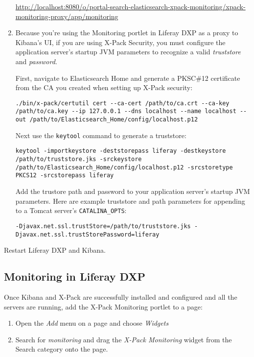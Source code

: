 \begin{enumerate}
  \url{http://localhost:8080/o/portal-search-elasticsearch-xpack-monitoring/xpack-monitoring-proxy/app/monitoring}
\item
  Because you're using the Monitoring portlet in Liferay DXP as a proxy
  to Kibana's UI, if you are using X-Pack Security, you must configure
  the application server's startup JVM parameters to recognize a valid
  \emph{truststore} and \emph{password}.

  First, navigate to Elasticsearch Home and generate a PKSC\#12
  certificate from the CA you created when setting up X-Pack security:

\begin{verbatim}
./bin/x-pack/certutil cert --ca-cert /path/to/ca.crt --ca-key /path/to/ca.key --ip 127.0.0.1 --dns localhost --name localhost --out /path/to/Elasticsearch_Home/config/localhost.p12
\end{verbatim}

  Next use the \texttt{keytool} command to generate a truststore:

\begin{verbatim}
keytool -importkeystore -deststorepass liferay -destkeystore /path/to/truststore.jks -srckeystore /path/to/Elasticsearch_Home/config/localhost.p12 -srcstoretype PKCS12 -srcstorepass liferay
\end{verbatim}

  Add the trustore path and password to your application server's
  startup JVM parameters. Here are example truststore and path
  parameters for appending to a Tomcat server's \texttt{CATALINA\_OPTS}:

\begin{verbatim}
-Djavax.net.ssl.trustStore=/path/to/truststore.jks -Djavax.net.ssl.trustStorePassword=liferay
\end{verbatim}
\end{enumerate}

Restart Liferay DXP and Kibana.

\subsection{Monitoring in Liferay
DXP}\label{monitoring-in-liferay-dxp-1}

Once Kibana and X-Pack are successfully installed and configured and all
the servers are running, add the X-Pack Monitoring portlet to a page:

\begin{enumerate}
\def\labelenumi{\arabic{enumi}.}
\item
  Open the \emph{Add} menu on a page and choose \emph{Widgets}
\item
  Search for \emph{monitoring} and drag the \emph{X-Pack Monitoring}
  widget from the Search category onto the page.
\end{enumerate}

